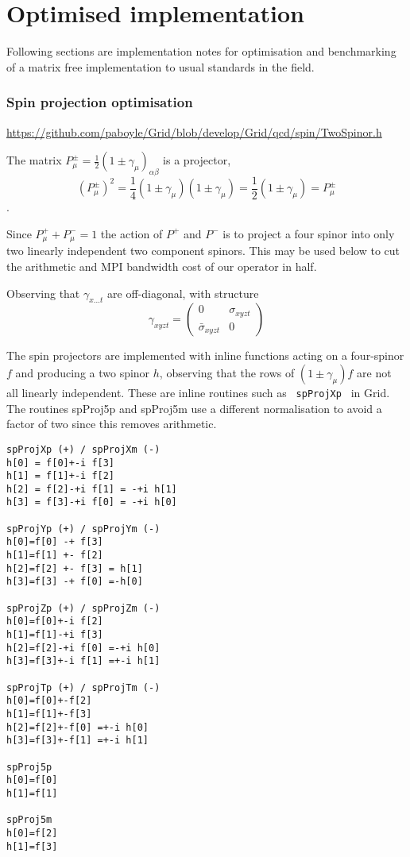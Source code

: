 \documentclass[letter,10pt]{report}
\begin{document}
\section{Optimised implementation}

Following sections are implementation notes for optimisation and benchmarking of a matrix free implementation to usual
standards in the field.

\subsubsection{Spin projection optimisation}

\href{https://github.com/paboyle/Grid/blob/develop/Grid/qcd/spin/TwoSpinor.h}{https://github.com/paboyle/Grid/blob/develop/Grid/qcd/spin/TwoSpinor.h}

The matrix $P^\pm_\mu = \frac{1}{2} (1\pm\gamma_\mu)_{\alpha\beta}$ is a projector,
$$(P^\pm_\mu)^2 =  \frac{1}{4} (1\pm\gamma_\mu)(1\pm\gamma_\mu) =
\frac{1}{2} (1\pm\gamma_\mu) = P^\pm_\mu$$.

Since $P^+_\mu + P^-_\mu = 1$ the action of $P^+$ and $P^-$ is to project a four spinor into
only two linearly independent two component spinors. This may be used below to cut the
arithmetic and MPI bandwidth cost of our operator in half.

Observing that $\gamma_{x\ldots t}$ are off-diagonal, with structure
$$
\gamma_{xyzt}= \left(\begin{array}{cc}    0& \sigma_{xyzt} \\  \bar{\sigma}_{xyzt} &0 \end{array}\right)
$$

The spin projectors are implemented with inline functions acting on a four-spinor $f$ and producing a two
spinor $h$, observing that the rows of $(1\pm\gamma_\mu) f$ are not all linearly independent.
These are inline routines such as \verb| spProjXp | in Grid.
The routines spProj5p and spProj5m use a different normalisation to avoid a factor of two since this
removes arithmetic.
\begin{verbatim}
spProjXp (+) / spProjXm (-)
h[0] = f[0]+-i f[3]
h[1] = f[1]+-i f[2]
h[2] = f[2]-+i f[1] = -+i h[1]
h[3] = f[3]-+i f[0] = -+i h[0]

spProjYp (+) / spProjYm (-)
h[0]=f[0] -+ f[3]
h[1]=f[1] +- f[2]
h[2]=f[2] +- f[3] = h[1]
h[3]=f[3] -+ f[0] =-h[0]

spProjZp (+) / spProjZm (-)
h[0]=f[0]+-i f[2]
h[1]=f[1]-+i f[3]
h[2]=f[2]-+i f[0] =-+i h[0]
h[3]=f[3]+-i f[1] =+-i h[1]

spProjTp (+) / spProjTm (-)
h[0]=f[0]+-f[2]
h[1]=f[1]+-f[3]
h[2]=f[2]+-f[0] =+-i h[0]
h[3]=f[3]+-f[1] =+-i h[1]

spProj5p
h[0]=f[0]
h[1]=f[1]

spProj5m
h[0]=f[2]
h[1]=f[3]
\end{verbatim}
\end{document}
